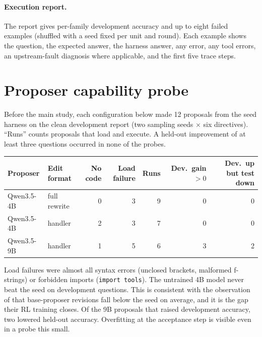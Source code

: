 \paragraph{Execution report.} The report gives per-family development accuracy and up to eight failed
examples (shuffled with a seed fixed per unit and round). Each example shows the question, the expected
answer, the harness answer, any error, any tool errors, an upstream-fault diagnosis where applicable,
and the first five trace steps.

\section{Proposer capability probe}
\label{app:proposer}
Before the main study, each configuration below made 12 proposals from the seed harness on the clean
development report (two sampling seeds $\times$ six directives). ``Runs'' counts proposals that load and
execute. A held-out improvement of at least three questions occurred in none of the probes.

\begin{center}
\begin{tabular}{llrrrrr}
\toprule
Proposer & Edit format & No code & Load failure & Runs & Dev.\ gain $>0$ & Dev.\ up but test down \\
\midrule
Qwen3.5-4B & full rewrite & 0 & 3 & 9 & 0 & 0 \\
Qwen3.5-4B & handler & 2 & 3 & 7 & 0 & 0 \\
Qwen3.5-9B & handler & 1 & 5 & 6 & 3 & 2 \\
\bottomrule
\end{tabular}
\end{center}
Load failures were almost all syntax errors (unclosed brackets, malformed f-strings) or forbidden
imports (\texttt{import tools}). The untrained 4B model never beat the seed on development questions.
This is consistent with the observation of \citet{zhang2026harnesslearning} that base-proposer revisions
fall below the seed on average, and it is the gap their RL training closes. Of the 9B proposals that
raised development accuracy, two lowered held-out accuracy. Overfitting at the acceptance step is
visible even in a probe this small.

